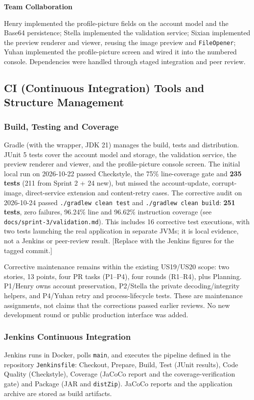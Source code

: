 \documentclass[a4paper,11pt]{article}
\begin{document}
\medskip
\noindent\textbf{Team Collaboration}\par
Henry implemented the profile-picture fields on the account model and the Base64 persistence; Stella implemented the validation service; Sixian implemented the preview renderer and viewer, reusing the image preview and \texttt{FileOpener}; Yuhan implemented the profile-picture screen and wired it into the numbered console. Dependencies were handled through staged integration and peer review.

\subsection{CI (Continuous Integration) Tools and Structure Management}

\subsubsection*{Build, Testing and Coverage}
Gradle (with the wrapper, JDK 21) manages the build, tests and distribution. JUnit 5 tests cover the account model and storage, the validation service, the preview renderer and viewer, and the profile-picture console screen. The initial local run on 2026-10-22 passed Checkstyle, the 75\% line-coverage gate and \textbf{235 tests} (211 from Sprint 2 + 24 new), but missed the account-update, corrupt-image, direct-service extension and content-retry cases. The corrective audit on 2026-10-24 passed \texttt{./gradlew clean test} and \texttt{./gradlew clean build}: \textbf{251 tests}, zero failures, 96.24\% line and 96.62\% instruction coverage (see \texttt{docs/sprint-3/validation.md}). This includes 16 corrective test executions, with two tests launching the real application in separate JVMs; it is local evidence, not a Jenkins or peer-review result. [Replace with the Jenkins figures for the tagged commit.]

Corrective maintenance remains within the existing US19/US20 scope: two stories, 13 points, four PR tasks (P1--P4), four rounds (R1--R4), plus Planning. P1/Henry owns account preservation, P2/Stella the private decoding/integrity helpers, and P4/Yuhan retry and process-lifecycle tests. These are maintenance assignments, not claims that the corrections passed earlier reviews. No new development round or public production interface was added.

\subsubsection*{Jenkins Continuous Integration}
Jenkins runs in Docker, polls \texttt{main}, and executes the pipeline defined in the repository \texttt{Jenkinsfile}: Checkout, Prepare, Build, Test (JUnit results), Code Quality (Checkstyle), Coverage (JaCoCo report and the coverage-verification gate) and Package (JAR and \texttt{distZip}). JaCoCo reports and the application archive are stored as build artifacts.
\end{document}
